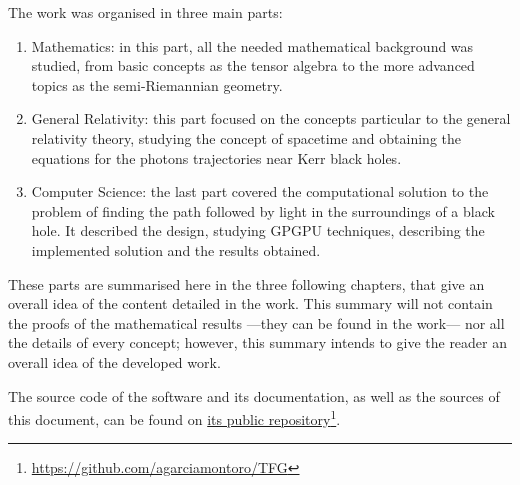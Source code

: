 The work was organised in three main parts:
\begin{enumerate}
	\item Mathematics: in this part, all the needed mathematical background was studied, from basic concepts as the tensor algebra to the more advanced topics as the semi-Riemannian geometry.
	\item General Relativity: this part focused on the concepts particular to the general relativity theory, studying the concept of spacetime and obtaining the equations for the photons trajectories near Kerr black holes.
	\item Computer Science: the last part covered the computational solution to the problem of finding the path followed by light in the surroundings of a black hole. It described the design, studying \ac{GPGPU} techniques, describing the implemented solution and the results obtained.
\end{enumerate}

These parts are summarised here in the three following chapters, that give an overall idea of the content detailed in the work. This summary will not contain the proofs of the mathematical results ---they can be found in the work--- nor all the details of every concept; however, this summary intends to give the reader an overall idea of the developed work.

The source code of the software and its documentation, as well as the sources of this document, can be found on \href{https://github.com/agarciamontoro/TFG}{its public repository}\footnote{\url{https://github.com/agarciamontoro/TFG}}.